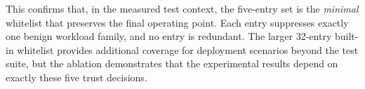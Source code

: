 \documentclass[twocolumn, 10pt]{scrartcl}
\begin{document}
This confirms that, in the measured test context, the five-entry set is the
\emph{minimal} whitelist that preserves the final operating point. Each entry
suppresses exactly one benign workload family, and no entry is redundant. The
larger 32-entry built-in whitelist provides additional coverage for deployment
scenarios beyond the test suite, but the ablation demonstrates that the
experimental results depend on exactly these five trust decisions.
\end{document}
